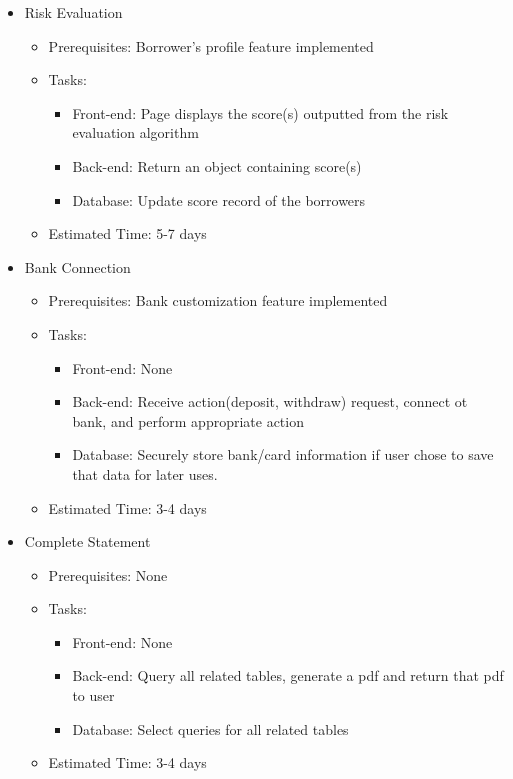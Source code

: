 \begin{itemize}
	\item Risk Evaluation
	\begin{itemize}
		\item Prerequisites: Borrower's profile feature implemented
		\item Tasks:
		\begin{itemize}
			\item Front-end: Page displays the score(s) outputted from the risk evaluation algorithm
			\item Back-end: Return an object containing score(s)
			\item Database: Update score record of the borrowers
		\end{itemize}
		\item Estimated Time: 5-7 days
	\end{itemize}

	\item Bank Connection
	\begin{itemize}
		\item Prerequisites: Bank customization feature implemented
		\item Tasks:
		\begin{itemize}
			\item Front-end: None
			\item Back-end: Receive action(deposit, withdraw) request, connect ot bank, and perform appropriate action
			\item Database: Securely store bank/card information if user chose to save that data for later uses.
		\end{itemize}
		\item Estimated Time: 3-4 days
	\end{itemize}

	\item Complete Statement
	\begin{itemize}
		\item Prerequisites: None
		\item Tasks:
		\begin{itemize}
			\item Front-end: None
			\item Back-end: Query all related tables, generate a pdf and return that pdf to user
			\item Database: Select queries for all related tables
		\end{itemize}
		\item Estimated Time: 3-4 days
	\end{itemize}


\end{itemize}
